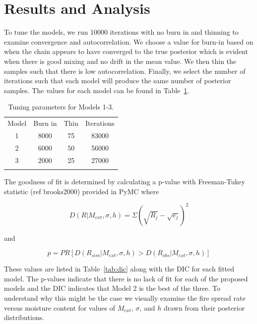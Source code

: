 \documentclass[11pt]{article}
\begin{document}
\section{Results and Analysis}
\label{sec:res}

To tune the models, we run 10000 iterations with no burn in and thinning to examine convergence and autocorrelation. We choose a value for burn-in based on when the chain appears to have converged to the true posterior which is evident when there is good mixing and no drift in the mean value. We then thin the samples such that there is low autocorrelation. Finally, we select the number of iterations such that each model will produce the same number of posterior samples. The values for each model can be found in Table~\ref{tab:tune}.

\begin{table}[h]
\caption{Tuning parameters for Models 1-3.}
\begin{center}
  \begin{tabular}{cccc}
    \hline\noalign{\smallskip}
    Model & Burn in & Thin & Iterations \\
    \noalign{\smallskip}\hline\noalign{\smallskip}
    1 & 8000 & 75 & 83000 \\
    2 & 6000 & 50 & 56000 \\ 
    3 & 2000 & 25 & 27000 \\ 
    \noalign{\smallskip}\hline
  \end{tabular}
\end{center}
\label{tab:tune}
\end{table}

The goodness of fit is determined by calculating a p-value with Freeman-Tukey statistic (ref brooks2000) provided in PyMC where  

\begin{equation}
D(R|M_{ext},\sigma,h) = \Sigma(\sqrt{R_j} - \sqrt{e_j})^2
\label{eq:D_val}
\end{equation}

\noindent and

\begin{equation}
p = PR[D(R_{sim}|M_{ext},\sigma,h) > D(R_{obs}|M_{ext},\sigma,h)]
\label{eq:p_val}
\end{equation}

These values are listed in Table~\ref{tab:dic} along with the DIC for each fitted model. The p-values indicate that there is no lack of fit for each of the proposed models and the DIC indicates that Model 2 is the best of the three. To understand why this might be the case we visually examine the fire spread rate versus moisture content for values of $M_{ext}$, $\sigma$, and $h$ drawn from their posterior distributions.
\end{document}
